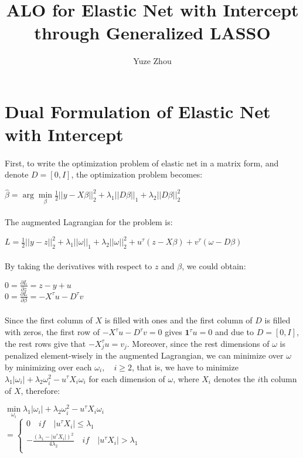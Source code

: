 \documentclass{article}
\title{ALO for Elastic Net with Intercept through Generalized LASSO}
\author{Yuze Zhou}
\begin{document}
\section{Dual Formulation of Elastic Net with Intercept}
\paragraph{}First, to write the optimization problem of elastic net in a matrix form, and denote $D =[0, I]$, the optimization problem becomes:
\begin{center}
$\hat{\beta} = \arg \min\limits_{\beta} \frac{1}{2}||y-X\beta||_{2}^{2} + \lambda_{1}||D\beta||_{1}+\lambda_{2}||D\beta||_{2}^{2}$
\end{center}
\paragraph{}The augmented Lagrangian for the problem is:
\begin{center}
$L = \frac{1}{2}||y-z||_{2}^{2} + \lambda_{1}||\omega||_{1}+\lambda_{2}||\omega||_{2}^{2} + u^{\tau}(z-X\beta) + v^{\tau}(\omega-D\beta)$
\end{center}
\paragraph{}By taking the derivatives with respect to $z$ and $\beta$, we could obtain:
\begin{center}
$0 = \frac{\partial L}{\partial z} = z-y+u$\\
$0 = \frac{\partial L}{\partial \beta} = -X^{\tau}u-D^{\tau}v$
\end{center}
\paragraph{}Since the first column of $X$ is filled with ones and the first column of $D$ is filled with zeros, the first row of $-X^{\tau}u-D^{\tau}v = 0$ gives $\textbf{1}^{\tau} u = 0$ and due to $D = [0,I]$, the rest rows give that $-X_{j}^{\tau}u = v_{j}$. Moreover, since the rest dimensions of $\omega$ is penalized element-wisely in the augmented Lagrangian, we can minimize over $\omega$ by minimizing over each $\omega_{i}, \quad i \geq 2$, that is, we have to minimize $\lambda_{1}|\omega_{i}| + \lambda_{2}\omega_{i}^{2} - u^{\tau}X_{i}\omega_{i}$ for each dimension of $\omega$, where $X_{i}$ denotes the $i$th column of $X$, therefore:
\begin{center}
$\min\limits_{\omega_{i}} \lambda_{1}|\omega_{i}| + \lambda_{2}\omega_{i}^{2} - u^{\tau}X_{i}\omega_{i} $\\
$ $\\
$= \left\{
\begin{aligned}
0 \quad if \quad |u^{\tau}X_{i}| \leq \lambda_{1}\\
-\frac{(\lambda_{1}-|u^{\tau}X_{i}|)^{2}}{4\lambda_{2}} \quad if \quad |u^{\tau}X_{i}| > \lambda_{1}\\
\end{aligned}
\right.
$
\end{center}
\end{document}
